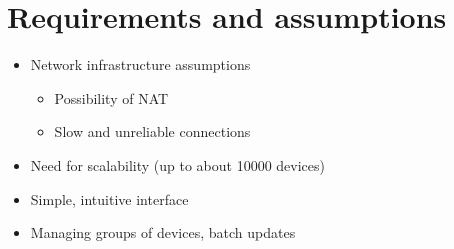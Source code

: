 \section{Requirements and assumptions}

\begin{itemize}
\item Network infrastructure assumptions
\begin{itemize}
\item Possibility of NAT
\item Slow and unreliable connections
\end{itemize}
\item Need for scalability (up to about 10000 devices)
\item Simple, intuitive interface
\item Managing groups of devices, batch updates
\end{itemize}
